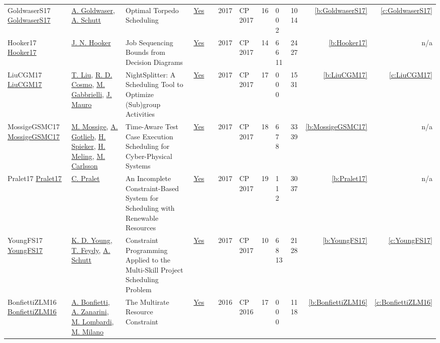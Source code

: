 {\begin{longtable}{>{\raggedright\arraybackslash}p{3cm}>{\raggedright\arraybackslash}p{4.5cm}>{\raggedright\arraybackslash}p{6.0cm}rrrp{2.5cm}rp{1cm}p{1cm}rr}
GoldwaserS17 \href{https://doi.org/10.1007/978-3-319-66158-2_22}{GoldwaserS17} & \hyperref[auth:a189]{A. Goldwaser}, \hyperref[auth:a124]{A. Schutt} & Optimal Torpedo Scheduling & \href{../works/GoldwaserS17.pdf}{Yes} & \cite{GoldwaserS17} & 2017 & CP 2017 & 16 & 0 0 2 & 10 14 & \ref{b:GoldwaserS17} & \ref{c:GoldwaserS17}\\
Hooker17 \href{https://doi.org/10.1007/978-3-319-66158-2_36}{Hooker17} & \hyperref[auth:a160]{J. N. Hooker} & Job Sequencing Bounds from Decision Diagrams & \href{../works/Hooker17.pdf}{Yes} & \cite{Hooker17} & 2017 & CP 2017 & 14 & 6 6 11 & 24 27 & \ref{b:Hooker17} & n/a\\
LiuCGM17 \href{https://doi.org/10.1007/978-3-319-66158-2_24}{LiuCGM17} & \hyperref[auth:a190]{T. Liu}, \hyperref[auth:a191]{R. D. Cosmo}, \hyperref[auth:a192]{M. Gabbrielli}, \hyperref[auth:a193]{J. Mauro} & \cellcolor{green!10}NightSplitter: {A} Scheduling Tool to Optimize (Sub)group Activities & \href{../works/LiuCGM17.pdf}{Yes} & \cite{LiuCGM17} & 2017 & CP 2017 & 17 & 0 0 0 & 15 31 & \ref{b:LiuCGM17} & \ref{c:LiuCGM17}\\
MossigeGSMC17 \href{https://doi.org/10.1007/978-3-319-66158-2_25}{MossigeGSMC17} & \hyperref[auth:a194]{M. Mossige}, \hyperref[auth:a195]{A. Gotlieb}, \hyperref[auth:a196]{H. Spieker}, \hyperref[auth:a197]{H. Meling}, \hyperref[auth:a91]{M. Carlsson} & \cellcolor{green!10}Time-Aware Test Case Execution Scheduling for Cyber-Physical Systems & \href{../works/MossigeGSMC17.pdf}{Yes} & \cite{MossigeGSMC17} & 2017 & CP 2017 & 18 & 6 7 8 & 33 39 & \ref{b:MossigeGSMC17} & n/a\\
Pralet17 \href{https://doi.org/10.1007/978-3-319-66158-2_16}{Pralet17} & \hyperref[auth:a21]{C. Pralet} & An Incomplete Constraint-Based System for Scheduling with Renewable Resources & \href{../works/Pralet17.pdf}{Yes} & \cite{Pralet17} & 2017 & CP 2017 & 19 & 1 1 2 & 30 37 & \ref{b:Pralet17} & n/a\\
YoungFS17 \href{https://doi.org/10.1007/978-3-319-66158-2_20}{YoungFS17} & \hyperref[auth:a188]{K. D. Young}, \hyperref[auth:a154]{T. Feydy}, \hyperref[auth:a124]{A. Schutt} & Constraint Programming Applied to the Multi-Skill Project Scheduling Problem & \href{../works/YoungFS17.pdf}{Yes} & \cite{YoungFS17} & 2017 & CP 2017 & 10 & 6 8 13 & 21 28 & \ref{b:YoungFS17} & \ref{c:YoungFS17}\\
BonfiettiZLM16 \href{https://doi.org/10.1007/978-3-319-44953-1_8}{BonfiettiZLM16} & \hyperref[auth:a198]{A. Bonfietti}, \hyperref[auth:a199]{A. Zanarini}, \hyperref[auth:a142]{M. Lombardi}, \hyperref[auth:a143]{M. Milano} & The Multirate Resource Constraint & \href{../works/BonfiettiZLM16.pdf}{Yes} & \cite{BonfiettiZLM16} & 2016 & CP 2016 & 17 & 0 0 0 & 11 18 & \ref{b:BonfiettiZLM16} & \ref{c:BonfiettiZLM16}\\

\end{longtable}}
